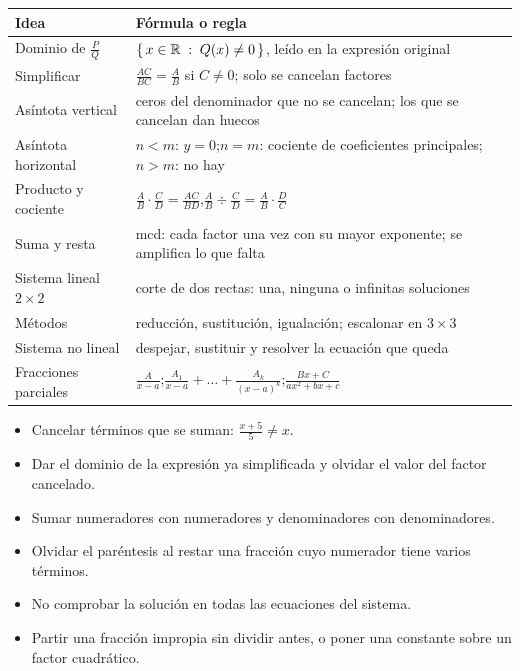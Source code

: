 \documentclass[11pt,a4paper]{article}
\begin{document}
\clearpage
\repaso
\begin{center}\renewcommand{\arraystretch}{1.55}
\begin{tabularx}{\linewidth}{@{}l L@{}}
\toprule
Idea & Fórmula o regla\\ \midrule
Dominio de $\frac{P}{Q}$ & $\left\{\,x\in\mathbb{R}\;:\; Q(x)\neq0\,\right\}$, leído en la expresión original\\
Simplificar & $\frac{AC}{BC}=\frac{A}{B}$ si $C\neq0$; solo se cancelan factores\\
Asíntota vertical & ceros del denominador que no se cancelan; los que se cancelan dan huecos\\
Asíntota horizontal & $n<m$: $y=0$;\quad $n=m$: cociente de coeficientes principales;\quad $n>m$: no hay\\
Producto y cociente & $\frac{A}{B}\cdot\frac{C}{D}=\frac{AC}{BD}$,\quad $\frac{A}{B}\div\frac{C}{D}=\frac{A}{B}\cdot\frac{D}{C}$\\
Suma y resta & mcd: cada factor una vez con su mayor exponente; se amplifica lo que falta\\
Sistema lineal $2\times2$ & corte de dos rectas: una, ninguna o infinitas soluciones\\
Métodos & reducción, sustitución, igualación; escalonar en $3\times3$\\
Sistema no lineal & despejar, sustituir y resolver la ecuación que queda\\
Fracciones parciales & $\frac{A}{x-a}$;\quad $\frac{A_1}{x-a}+\dots+\frac{A_k}{(x-a)^k}$;\quad $\frac{Bx+C}{ax^2+bx+c}$\\
\bottomrule
\end{tabularx}
\end{center}

\begin{ojo}
\begin{itemize}
\item Cancelar términos que se suman: $\frac{x+5}{5}\neq x$.
\item Dar el dominio de la expresión ya simplificada y olvidar el valor del factor cancelado.
\item Sumar numeradores con numeradores y denominadores con denominadores.
\item Olvidar el paréntesis al restar una fracción cuyo numerador tiene varios términos.
\item No comprobar la solución en todas las ecuaciones del sistema.
\item Partir una fracción impropia sin dividir antes, o poner una constante sobre un factor cuadrático.
\end{itemize}
\end{ojo}
\end{document}
